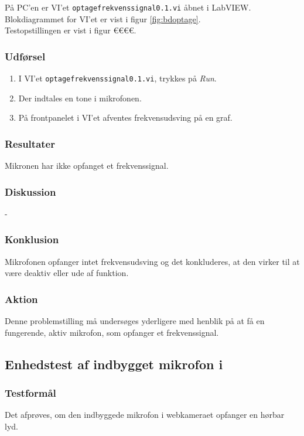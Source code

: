 			På PC'en er VI'et \texttt{optagefrekvenssignal0.1.vi} åbnet i LabVIEW. Blokdiagrammet for VI'et er vist i figur \ref{fig:bdoptage}.   \\   
			
			Testopstillingen er vist i figur €€€€.\\ 
	
		\subsubsection{Udførsel}
			\begin{enumerate}
				\item I VI'et \texttt{optagefrekvenssignal0.1.vi}, trykkes på \textit{Run}.  
				\item Der indtales en tone i mikrofonen. 
				\item På frontpanelet i VI'et afventes frekvensudsving på en graf.  
			\end{enumerate}
		
		\subsubsection{Resultater}
		Mikronen har ikke opfanget et frekvenssignal. 
		\subsubsection{Diskussion} 
		-
		\subsubsection{Konklusion}
		Mikrofonen opfanger intet frekvensudsving og det konkluderes, at den virker til at være deaktiv eller ude af funktion.
		\subsubsection{Aktion}
		Denne problemstilling må undersøges yderligere med henblik på at få en fungerende, aktiv mikrofon, som opfanger et frekvenssignal. 
		
	\subsection{Enhedstest af indbygget mikrofon i \webcammic}
		\subsubsection{Testformål}
		Det afprøves, om den indbyggede mikrofon i webkameraet opfanger en hørbar lyd. 
		
